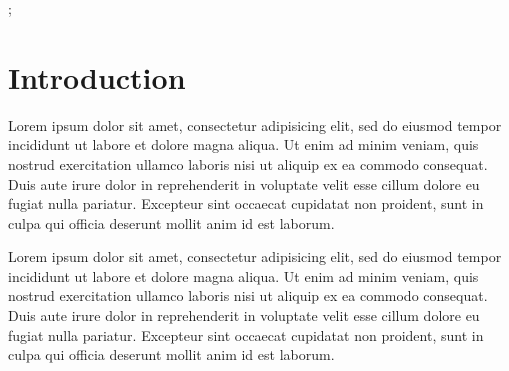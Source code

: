 \documentclass[review]{acmsiggraph}
\begin{document}

\begin{CRcatlist}
  ;
\end{CRcatlist}


\keywordlist


\TOGlinkslist


\copyrightspace


\section{Introduction}

Lorem ipsum dolor sit amet, consectetur adipisicing elit, sed do
eiusmod tempor incididunt ut labore et dolore magna aliqua. Ut enim ad
minim veniam, quis nostrud exercitation ullamco laboris nisi ut
aliquip ex ea commodo consequat. Duis aute irure dolor in
reprehenderit in voluptate velit esse cillum dolore eu fugiat nulla
pariatur. Excepteur sint occaecat cupidatat non proident, sunt in
culpa qui officia deserunt mollit anim id est laborum.

Lorem ipsum dolor sit amet, consectetur adipisicing elit, sed do
eiusmod tempor incididunt ut labore et dolore magna aliqua. Ut enim ad
minim veniam, quis nostrud exercitation ullamco laboris nisi ut
aliquip ex ea commodo consequat. Duis aute irure dolor in
reprehenderit in voluptate velit esse cillum dolore eu fugiat nulla
pariatur. Excepteur sint occaecat cupidatat non proident, sunt in
culpa qui officia deserunt mollit anim id est laborum.
\end{document}
